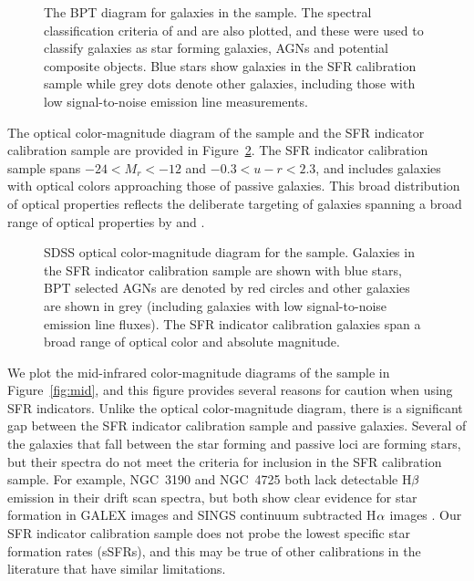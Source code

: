 \documentclass[preprint]{aastex61}
\begin{document}
\begin{figure}
\caption{The BPT diagram for galaxies in the \citet{bro14} sample. The spectral classification criteria of \citet{kew01} and \citet{kau03} are also plotted, and these were used to classify galaxies as star forming galaxies, AGNs and potential composite objects. Blue stars show galaxies in the SFR calibration sample while grey dots denote other galaxies, including those with low signal-to-noise emission line measurements.}
\label{fig:bpt}
\end{figure}

The optical color-magnitude diagram of the \citet{bro14} sample and the SFR indicator calibration sample are provided in Figure~\ref{fig:optical}. The SFR indicator calibration sample spans $-24<M_r<-12$ and $-0.3<u-r<2.3$, and includes galaxies with optical colors approaching those of passive galaxies. This broad distribution of optical properties reflects the deliberate targeting of galaxies spanning a broad range of optical properties by \citet{mou06} and \citet{mou10}.

\begin{figure}   
\caption{SDSS optical color-magnitude diagram for the sample. Galaxies in the SFR indicator calibration sample are shown with blue stars, BPT selected AGNs are denoted by red circles and other galaxies are shown in grey (including galaxies with low signal-to-noise emission line fluxes). The SFR indicator calibration galaxies span a broad range of optical color and absolute magnitude.}
\label{fig:optical}
\end{figure}

We plot the mid-infrared color-magnitude diagrams of the sample in Figure~\ref{fig:mid}, and this figure provides several reasons for caution when using SFR indicators. Unlike the optical color-magnitude diagram, there is a significant gap between the SFR indicator calibration sample and passive galaxies. Several of the galaxies that fall between the star forming and passive loci are forming stars, but their spectra do not meet the criteria for inclusion in the SFR calibration sample. For example, NGC~3190 and NGC~4725 both lack detectable H${\rm \beta}$ emission in their drift scan spectra, but both show clear evidence for star formation in GALEX images and SINGS continuum subtracted H${\rm \alpha}$ images \citep{ken03}. Our SFR indicator calibration sample does not probe the lowest specific star formation rates (sSFRs), and this may be true of other calibrations in the literature that have similar limitations. 
\end{document}
